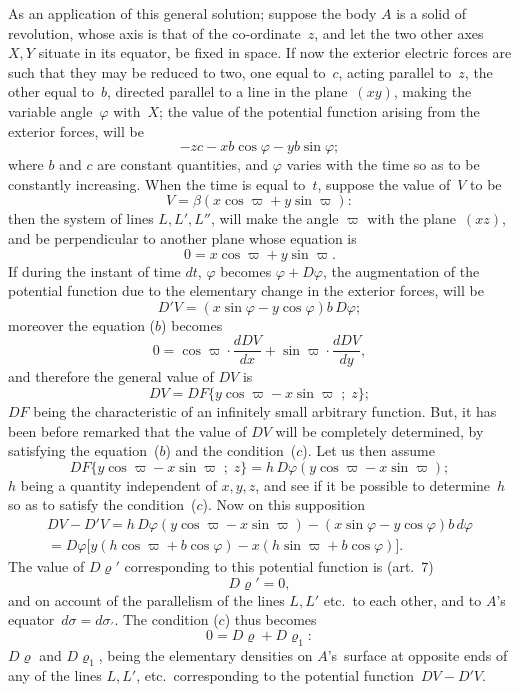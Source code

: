\documentclass[12pt,notitlepage]{amsart}
\renewcommand{\rho}{\varrho}
\renewcommand{\phi}{\varphi}
\begin{document}
As an application of this general solution; suppose the body $A$ is a
solid of revolution, whose axis is that of the co-ordinate~$z$, and let the two
other axes~$X,Y$ situate in its equator, be fixed in space. If now the exterior
electric forces are such that they may be reduced to two, one equal
to~$c$, acting parallel to~$z$,
the other equal to~$b$, directed parallel to a line in
the plane~$(xy)$, making the variable angle~$\phi$ with~$X$;
the value of the potential function arising
from the exterior forces, will be
\[
-zc-xb\cos\phi-yb\sin\phi;
\]
where $b$ and $c$ are constant quantities,
and $\phi$ varies with the time so as to
be constantly increasing. When the time is equal to~$t$, suppose the value
of~$V$ to be
\[
V=\beta(x\cos\varpi+y\sin\varpi):
\]
then the system of lines $L, L', L''$,
will make the angle $\varpi$ with the plane~$(xz)$,
and be perpendicular to another plane whose equation is
\[
0=x\cos\varpi+y\sin\varpi.
\]
If during the instant of time $dt$, $\phi$ becomes $\phi+D\phi$,
the augmentation of
the potential function due to the elementary change in the exterior forces,
will be
\[
D'V = (x\sin\phi-y\cos\phi)b\,D\phi;
\]
moreover the equation ($b$) becomes
\[
\tag{$b'$.}
0=\cos\varpi\cdot\frac{dDV}{dx}+\sin\varpi\cdot\frac{dDV}{dy},
\]
and therefore the general value of $DV$ is
\[
DV=DF\{y\cos\varpi-x\sin\varpi\;;\;z\};
\]
$DF$ being the characteristic of an infinitely small arbitrary function. But, it
has been before remarked that the value of $DV$ will be completely determined,
by satisfying the equation~($b$) and the condition~($c$). Let us then assume
\[
DF\{y\cos\varpi-x\sin\varpi\;;\;z\}=h\,D\phi(y\cos\varpi-x\sin\varpi);
\]
$h$ being a quantity independent of $x,y,z$, and see if it be possible to 
determine~$h$ so as to satisfy the condition~($c$). Now on this supposition
\begin{multline*}
DV-D'V=h\,D\phi(y\cos\varpi-x\sin\varpi)-(x\sin\phi-y\cos\phi)b\,d\phi\\
=D\phi\bigl[y(h\cos\varpi+b\cos\phi)-x(h\sin\varpi+b\cos\phi)\bigr].
\end{multline*}
The value of $D\rho'$ corresponding to this potential function
is (art.~7)
\[
D\rho'=0,
\]
and on account of the parallelism of the lines $L,L'$ etc.\ to each other, and
to $A$'s equator~$d\sigma=d\sigma_\prime$. The condition ($c$) thus becomes
\[
\tag{$c'$.}
0=D\rho+D\rho_1:
\]
$D\rho$ and $D\rho_1$,
being the elementary densities on $A$'s~surface at opposite ends
of any of the lines $L,L'$, etc.\ 
corresponding to the potential function~${DV-D'V}$.
\end{document}
